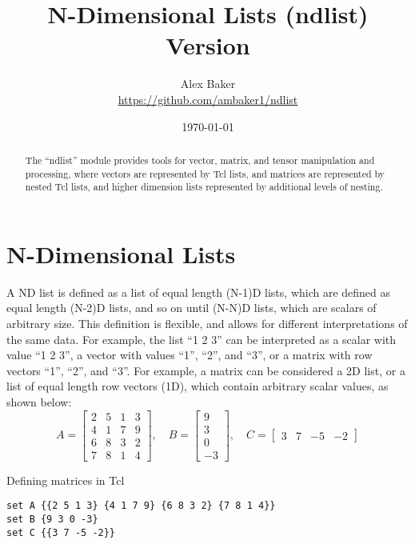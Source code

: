 \documentclass{article}
\title{\Huge{N-Dimensional Lists (ndlist)}\\\large Version \version}
\author{Alex Baker\\\small\url{https://github.com/ambaker1/ndlist}}
\date{\small\today}
\begin{document}
\maketitle
\begin{abstract}
\begin{center}
The ``ndlist'' module provides tools for vector, matrix, and tensor manipulation and processing, where vectors are represented by Tcl lists, and matrices are represented by nested Tcl lists, and higher dimension lists represented by additional levels of nesting. 
\end{center}
\end{abstract}
\clearpage
\section{N-Dimensional Lists}


A ND list is defined as a list of equal length (N-1)D lists, which are defined as equal length (N-2)D lists, and so on until (N-N)D lists, which are scalars of arbitrary size.
This definition is flexible, and allows for different interpretations of the same data. 
For example, the list ``1 2 3'' can be interpreted as a scalar with value ``1 2 3'', a vector with values ``1'', ``2'', and ``3'', or a matrix with row vectors ``1'', ``2'', and ``3''. 
For example, a matrix can be considered a 2D list, or a list of equal length row vectors (1D), which contain arbitrary scalar values, as shown below:
\begin{equation*}\label{eq:matrix_AB}
A=\begin{bmatrix}
2 & 5 & 1 & 3 \\
4 & 1 & 7 & 9 \\
6 & 8 & 3 & 2 \\
7 & 8 & 1 & 4
\end{bmatrix},\quad
B=\begin{bmatrix}
9 \\ 3 \\ 0 \\ -3
\end{bmatrix},\quad
C = \begin{bmatrix}
3 & 7 & -5 & -2
\end{bmatrix}
\end{equation*}
\begin{example}{Defining matrices in Tcl}
\begin{lstlisting}
set A {{2 5 1 3} {4 1 7 9} {6 8 3 2} {7 8 1 4}}
set B {9 3 0 -3}
set C {{3 7 -5 -2}}
\end{lstlisting}
\end{example}
\end{document}
